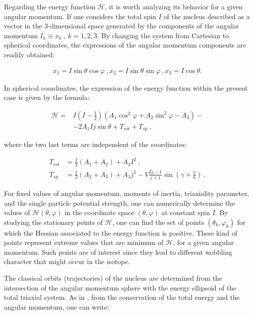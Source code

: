 \documentclass[%
 reprint,
 amsmath,
 amssymb,
 aps,
 floatfix,
]{revtex4-2}
\begin{document}
Regarding the energy function $\mathcal{H}$, it is worth analyzing its behavior for a given angular momentum. If one considers the total spin $I$ of the nucleus described as a vector in the 3-dimensional space generated by the components of the angular momentum $I_k\equiv x_k\ ,\ k=1,2,3$. By changing the system from Cartesian to spherical coordinates, the expressions of the angular momentum components are readily obtained:

\begin{align}
    x_1=I\sin\theta \cos\varphi\ ,
    x_2=I\sin\theta \sin\varphi\ ,
    x_3=I\cos\theta.
\end{align}

In spherical coordinates, the expression of the energy function within the present case is given by the formula:

\begin{align}
    \mathcal{H}=&I\left(I-\frac{1}{2}\right)\left(A_1\cos^2\varphi+A_2\sin^2\varphi-A_3\right)-\\
    &-2A_1Ij\sin\theta+T_{rot}+T_{sp}\ , \label{energy_function}
\end{align}

where the two last terms are independent of the coordinates:

\begin{align}
    T_{rot}&=\frac{I}{2}(A_1+A_2)+A_3I^2\ ,\\
    T_{sp}&=\frac{j}{2}(A_2+A_3)+A_1j^2-V\frac{2j-1}{j+1}\sin\left(\gamma+\frac{\pi}{6}\right)\ .
\end{align}

For fixed values of angular momentum, moments of inertia, triaxiality parameter, and the single particle potential strength, one can numerically determine the values of $\mathcal{H}(\theta,\varphi)$ in the coordinate space $(\theta,\varphi)$ at constant spin $I$. By studying the stationary points of $\mathcal{H}$, one can find the set of points $(\theta_k,\varphi_k)$ for which the Hessian associated to the energy function is positive. These kind of points represent extreme values that are minimum of $\mathcal{H}$, for a given angular momentum. Such points are of interest since they lead to different wobbling character that might occur in the isotope.

The classical orbits (trajectories) of the nucleus are determined from the intersection of the angular momentum sphere with the energy ellipsoid of the total triaxial system. As in \cite{frauendorf2014transverse}, from the conservation of the total energy and the angular momentum, one can write:
\end{document}
